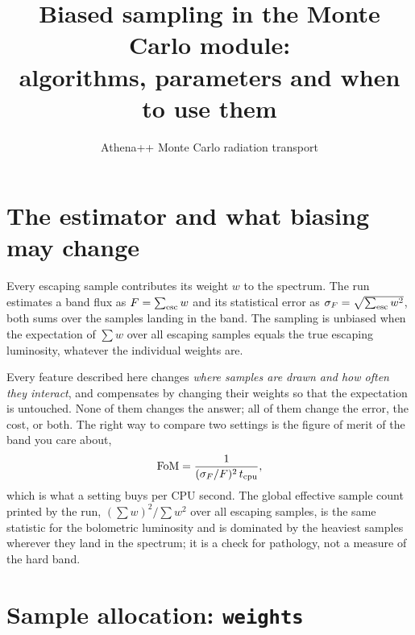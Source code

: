\documentclass[11pt]{article}
\title{Biased sampling in the Monte Carlo module:\\ algorithms, parameters and when to use them}
\author{Athena++ Monte Carlo radiation transport}
\date{}
\newcommand{\key}[1]{\texttt{#1}}
\begin{document}
\sloppy
\maketitle

\section{The estimator and what biasing may change}

Every escaping sample contributes its weight $w$ to the spectrum. The run estimates a
band flux as $F = \sum_{\rm esc} w$ and its statistical error as
$\sigma_F = \sqrt{\sum_{\rm esc} w^2}$, both sums over the samples landing in the band.
The sampling is unbiased when the expectation of $\sum w$ over all escaping samples equals
the true escaping luminosity, whatever the individual weights are.

Every feature described here changes \emph{where samples are drawn and how often they
interact}, and compensates by changing their weights so that the expectation is untouched.
None of them changes the answer; all of them change the error, the cost, or both. The
right way to compare two settings is the figure of merit of the band you care about,
\begin{equation}
  \mathrm{FoM} = \frac{1}{(\sigma_F/F)^2\, t_{\rm cpu}},
\end{equation}
which is what a setting buys per CPU second. The global effective sample count printed by
the run, $(\sum w)^2/\sum w^2$ over all escaping samples, is the same statistic for the
bolometric luminosity and is dominated by the heaviest samples wherever they land in the
spectrum; it is a check for pathology, not a measure of the hard band.

\section{Sample allocation: \key{weights}}
\end{document}
